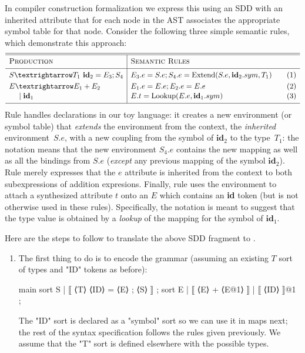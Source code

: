 \documentclass[11pt]{article} %
\begin{document}
\begin{example}
  In compiler construction formalization we express this using an SDD with an inherited attribute that
  for each node in the AST associates the appropriate symbol table for that node. Consider the
  following three simple semantic rules, which demonstrate this approach:
  \begin{equation*}
    \begin{array}{l|ll}
      \hline
      \hline
      \textsc{Production}  & \textsc{Semantic Rules} \Bigstrut&\\
      \hline
      S → T_1 ~ \textbf{id}_2 = E_3; S_4
      &
      E_3.e = S.e; 
      S_4.e = \op{Extend}(S.e, \textbf{id}_2.sym, T_1) \Bigstrut\quad
      &\thetag{1}
      \\[\jot]
      E → E_1 + E_2
      &
      E_1.e=E.e; E_2.e=E.e
      &\thetag{2}
      \\[1pt]
      \quad~\mid \textbf{id}_1
      &
      E.t = \op{Lookup}(E.e, \textbf{id}_1.sym)
      &\thetag{3}
      \\[\jot]
      \hline
    \end{array}
  \end{equation*}
  Rule  handles declarations in our toy language: it creates a new environment (or symbol
  table) that \emph{extends} the environment from the context, the \emph{inherited} environment~$S.e$,
  with a new coupling from the symbol of $\textbf{id}_2$ to the type~$T_1$: the notation means that
  the new environment $S_4.e$ contains the new mapping as well as all the bindings from $S.e$
  (\emph{except} any previous mapping of the symbol $\textbf{id}_2$).
  Rule  merely expresses that the $e$ attribute is inherited from the context to both
  subexpressions of addition expresions.
  Finally, rule  uses the environment to attach a synthesized attribute $t$ onto an $E$
  which contains an \textbf{id} token (but is not otherwise used in these rules). Specifically, the
  notation is meant to suggest that the type value is obtained by a \emph{lookup} of the mapping for
  the symbol of $\textbf{id}_1$.

  Here are the steps to follow to translate the above SDD fragment to \HAX.
  \begin{enumerate}

  \item The first thing to do is to encode the grammar (assuming an existing $T$ sort of types and
    "ID" tokens as before):
    \begin{hacs}
   main sort S  | ⟦ ⟨T⟩ ⟨ID⟩ = ⟨E⟩ ; ⟨S⟩ ⟧ ;
   sort E  | ⟦ ⟨E⟩ + ⟨E@1⟩ ⟧   | ⟦ ⟨ID⟩ ⟧@1 ;
\end{hacs}
The "ID" sort is declared as a "symbol" sort so we can use it in maps next; the rest of the
syntax specification follows the rules given previously. We assume that the "T" sort is defined
elsewhere with the possible types.


\end{enumerate}
\end{example}
\end{document}

